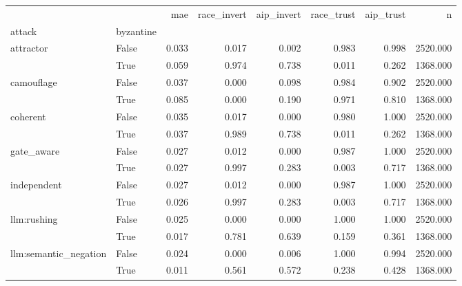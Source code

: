\begin{tabular}{llrrrrrr}
\toprule
 &  & mae & race\_invert & aip\_invert & race\_trust & aip\_trust & n \\
attack & byzantine &  &  &  &  &  &  \\
\midrule
\multirow[t]{2}{*}{attractor} & False & 0.033 & 0.017 & 0.002 & 0.983 & 0.998 & 2520.000 \\
 & True & 0.059 & 0.974 & 0.738 & 0.011 & 0.262 & 1368.000 \\
\cline{1-8}
\multirow[t]{2}{*}{camouflage} & False & 0.037 & 0.000 & 0.098 & 0.984 & 0.902 & 2520.000 \\
 & True & 0.085 & 0.000 & 0.190 & 0.971 & 0.810 & 1368.000 \\
\cline{1-8}
\multirow[t]{2}{*}{coherent} & False & 0.035 & 0.017 & 0.000 & 0.980 & 1.000 & 2520.000 \\
 & True & 0.037 & 0.989 & 0.738 & 0.011 & 0.262 & 1368.000 \\
\cline{1-8}
\multirow[t]{2}{*}{gate\_aware} & False & 0.027 & 0.012 & 0.000 & 0.987 & 1.000 & 2520.000 \\
 & True & 0.027 & 0.997 & 0.283 & 0.003 & 0.717 & 1368.000 \\
\cline{1-8}
\multirow[t]{2}{*}{independent} & False & 0.027 & 0.012 & 0.000 & 0.987 & 1.000 & 2520.000 \\
 & True & 0.026 & 0.997 & 0.283 & 0.003 & 0.717 & 1368.000 \\
\cline{1-8}
\multirow[t]{2}{*}{llm:rushing} & False & 0.025 & 0.000 & 0.000 & 1.000 & 1.000 & 2520.000 \\
 & True & 0.017 & 0.781 & 0.639 & 0.159 & 0.361 & 1368.000 \\
\cline{1-8}
\multirow[t]{2}{*}{llm:semantic\_negation} & False & 0.024 & 0.000 & 0.006 & 1.000 & 0.994 & 2520.000 \\
 & True & 0.011 & 0.561 & 0.572 & 0.238 & 0.428 & 1368.000 \\
\cline{1-8}
\bottomrule
\end{tabular}
